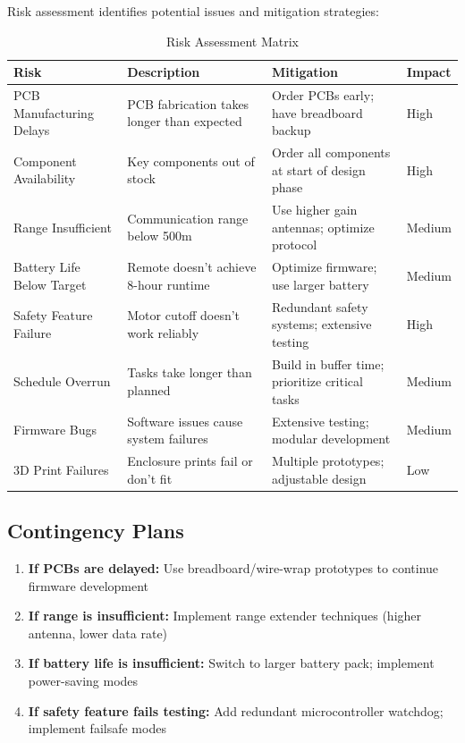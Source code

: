 Risk assessment identifies potential issues and mitigation strategies:

\begin{table}[h]
\centering
\begin{tabular}{|p{3cm}|p{4cm}|p{4cm}|p{2cm}|}
\hline
\textbf{Risk} & \textbf{Description} & \textbf{Mitigation} & \textbf{Impact} \\
\hline
PCB Manufacturing Delays & PCB fabrication takes longer than expected & Order PCBs early; have breadboard backup & High \\
\hline
Component Availability & Key components out of stock & Order all components at start of design phase & High \\
\hline
Range Insufficient & Communication range below 500m & Use higher gain antennas; optimize protocol & Medium \\
\hline
Battery Life Below Target & Remote doesn't achieve 8-hour runtime & Optimize firmware; use larger battery & Medium \\
\hline
Safety Feature Failure & Motor cutoff doesn't work reliably & Redundant safety systems; extensive testing & High \\
\hline
Schedule Overrun & Tasks take longer than planned & Build in buffer time; prioritize critical tasks & Medium \\
\hline
Firmware Bugs & Software issues cause system failures & Extensive testing; modular development & Medium \\
\hline
3D Print Failures & Enclosure prints fail or don't fit & Multiple prototypes; adjustable design & Low \\
\hline
\end{tabular}
\caption{Risk Assessment Matrix}
\end{table}

\subsection*{Contingency Plans}

\begin{enumerate}
    \item \textbf{If PCBs are delayed:} Use breadboard/wire-wrap prototypes to continue firmware development
    \item \textbf{If range is insufficient:} Implement range extender techniques (higher antenna, lower data rate)
    \item \textbf{If battery life is insufficient:} Switch to larger battery pack; implement power-saving modes
    \item \textbf{If safety feature fails testing:} Add redundant microcontroller watchdog; implement failsafe modes
\end{enumerate}

